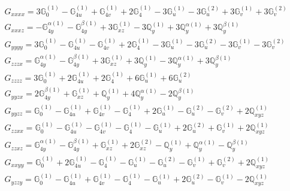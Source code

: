 \documentclass[fleqn,8pt,landscape]{jsarticle}
\begin{document}
\begin{align*}
& G_{xxxx} = 3 \mathbb{G}_{0}^{(1)} - \mathbb{G}_{4u}^{(1)} + \mathbb{G}_{4v}^{(1)} + 2 \mathbb{G}_{4}^{(1)} - 3 \mathbb{G}_{u}^{(1)} - 3 \mathbb{G}_{u}^{(2)} + 3 \mathbb{G}_{v}^{(1)} + 3 \mathbb{G}_{v}^{(2)} \\
& G_{xxxz} = - \mathbb{G}_{4y}^{\alpha(1)} - \mathbb{G}_{4y}^{\beta(1)} + 3 \mathbb{G}_{xz}^{(1)} - 3 \mathbb{Q}_{y}^{(1)} + 3 \mathbb{Q}_{y}^{\alpha(1)} + 3 \mathbb{Q}_{y}^{\beta(1)} \\
& G_{yyyy} = 3 \mathbb{G}_{0}^{(1)} - \mathbb{G}_{4u}^{(1)} - \mathbb{G}_{4v}^{(1)} + 2 \mathbb{G}_{4}^{(1)} - 3 \mathbb{G}_{u}^{(1)} - 3 \mathbb{G}_{u}^{(2)} - 3 \mathbb{G}_{v}^{(1)} - 3 \mathbb{G}_{v}^{(2)} \\
& G_{zzzx} = \mathbb{G}_{4y}^{\alpha(1)} - \mathbb{G}_{4y}^{\beta(1)} + 3 \mathbb{G}_{xz}^{(1)} + 3 \mathbb{Q}_{y}^{(1)} - 3 \mathbb{Q}_{y}^{\alpha(1)} + 3 \mathbb{Q}_{y}^{\beta(1)} \\
& G_{zzzz} = 3 \mathbb{G}_{0}^{(1)} + 2 \mathbb{G}_{4u}^{(1)} + 2 \mathbb{G}_{4}^{(1)} + 6 \mathbb{G}_{u}^{(1)} + 6 \mathbb{G}_{u}^{(2)} \\
& G_{yyzx} = 2 \mathbb{G}_{4y}^{\beta(1)} + \mathbb{G}_{xz}^{(1)} + \mathbb{Q}_{y}^{(1)} + 4 \mathbb{Q}_{y}^{\alpha(1)} - 2 \mathbb{Q}_{y}^{\beta(1)} \\
& G_{yyzz} = \mathbb{G}_{0}^{(1)} - \mathbb{G}_{4u}^{(1)} + \mathbb{G}_{4v}^{(1)} - \mathbb{G}_{4}^{(1)} + 2 \mathbb{G}_{u}^{(1)} - \mathbb{G}_{u}^{(2)} - \mathbb{G}_{v}^{(2)} + 2 \mathbb{Q}_{xyz}^{(1)} \\
& G_{zzxx} = \mathbb{G}_{0}^{(1)} - \mathbb{G}_{4u}^{(1)} - \mathbb{G}_{4v}^{(1)} - \mathbb{G}_{4}^{(1)} - \mathbb{G}_{u}^{(1)} + 2 \mathbb{G}_{u}^{(2)} + \mathbb{G}_{v}^{(1)} + 2 \mathbb{Q}_{xyz}^{(1)} \\
& G_{zzxz} = \mathbb{G}_{4y}^{\alpha(1)} - \mathbb{G}_{4y}^{\beta(1)} + \mathbb{G}_{xz}^{(1)} + 2 \mathbb{G}_{xz}^{(2)} - \mathbb{Q}_{y}^{(1)} + \mathbb{Q}_{y}^{\alpha(1)} - \mathbb{Q}_{y}^{\beta(1)} \\
& G_{xxyy} = \mathbb{G}_{0}^{(1)} + 2 \mathbb{G}_{4u}^{(1)} - \mathbb{G}_{4}^{(1)} - \mathbb{G}_{u}^{(1)} - \mathbb{G}_{u}^{(2)} - \mathbb{G}_{v}^{(1)} + \mathbb{G}_{v}^{(2)} + 2 \mathbb{Q}_{xyz}^{(1)} \\
& G_{yzzy} = \mathbb{G}_{0}^{(1)} - \mathbb{G}_{4u}^{(1)} + \mathbb{G}_{4v}^{(1)} - \mathbb{G}_{4}^{(1)} - \mathbb{G}_{u}^{(1)} + 2 \mathbb{G}_{u}^{(2)} - \mathbb{G}_{v}^{(1)} - 2 \mathbb{Q}_{xyz}^{(1)} \\

\end{align*}
\end{document}
